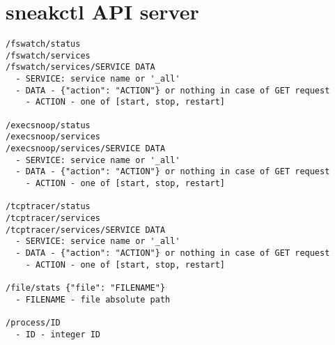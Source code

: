 \setcounter{figure}{0}
\setcounter{listing}{0}
\appendixpagenumbering

\chapter{sneakctl API server \label{appendix:sneakctl}}

\begin{lstlisting}[language=Clean, style=custom, label=appendix:sneakctl:api, caption={Outline of sneakctl API server endpoints.}]
/fswatch/status
/fswatch/services
/fswatch/services/SERVICE DATA
  - SERVICE: service name or '_all'
  - DATA - {"action": "ACTION"} or nothing in case of GET request
    - ACTION - one of [start, stop, restart]

/execsnoop/status
/execsnoop/services
/execsnoop/services/SERVICE DATA
  - SERVICE: service name or '_all'
  - DATA - {"action": "ACTION"} or nothing in case of GET request
    - ACTION - one of [start, stop, restart]

/tcptracer/status
/tcptracer/services
/tcptracer/services/SERVICE DATA
  - SERVICE: service name or '_all'
  - DATA - {"action": "ACTION"} or nothing in case of GET request
    - ACTION - one of [start, stop, restart]
    
/file/stats {"file": "FILENAME"}
  - FILENAME - file absolute path
  
/process/ID
  - ID - integer ID
\end{lstlisting}